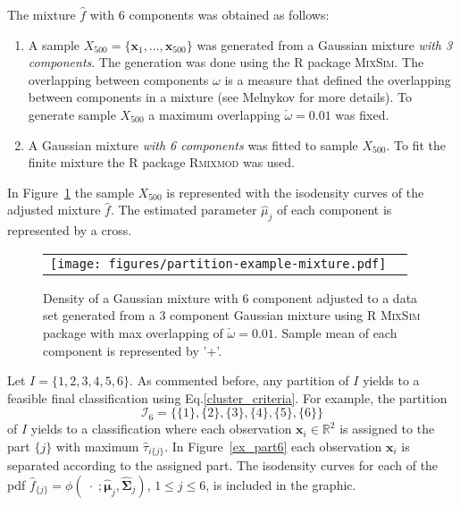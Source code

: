 \documentclass[10pt, a4paper]{article}
\DeclareMathOperator*{\argmax}{arg\,max}
\newcommand{\m}[1]{\boldsymbol{#1}}
\begin{document}
The mixture $\hat{f}$ with $6$ components was obtained as follows:
\begin{enumerate}
\item A sample  $X_{500}=\{\m x_1, \dots, \m x_{500}\}$ was generated from a Gaussian mixture \emph{with 3 components}. The generation was done using the R package \textsc{MixSim}. The overlapping between components $\omega$ is a measure that defined the overlapping between components in a mixture (see Melnykov for more details). To generate sample $X_{500}$ a maximum overlapping $\check{\omega} = 0.01$ was fixed.
\item A Gaussian mixture \emph{with 6 components} was fitted to sample $X_{500}$. To fit the finite mixture the R package \textsc{Rmixmod} was used.
\end{enumerate}
In Figure~\ref{ex_mixture} the sample $X_{500}$ is represented with the isodensity curves of the adjusted mixture $\hat{f}$. The estimated parameter $\hat{\mu}_j$ of each component is represented by a cross.

\begin{figure}[thbp]
\begin{center}
\begin{tabular}{cc}
  \texttt{[image: figures/partition-example-mixture.pdf]} \\
 \end{tabular}
 \caption{Density of a Gaussian mixture with 6 component adjusted to a data set generated from a 3 component Gaussian mixture using R \textsc{MixSim} package with max overlapping of $\check{\omega} = 0.01$. Sample mean of each component is represented by '+'.}\label{ex_mixture}
\end{center}
\end{figure}

Let $I = \{1,2,3,4,5,6\}$. As commented before, any partition of $I$ yields to a feasible final classification using Eq.\ref{cluster_criteria}. For example, the partition 
\[
\mathcal{I}_6 = \{\{1\},\{2\},\{3\},\{4\},\{5\},\{6\}\}
\]
of $I$ yields to a classification where each observation $\m x_i \in \mathbb{R}^2$ is  assigned to the part $\{j\}$ with maximum $\hat{\tau}_{i\{j\}}$. In Figure~\ref{ex_part6} each observation $\m x_i$ is separated according to the assigned part. The isodensity curves for each of the pdf $\hat{f}_{\{j\}} = \phi(\;\cdot\; ; \hat{\m\mu}_j, \hat{\m\Sigma}_j)$, $1\leq j \leq 6$, is included in the graphic. 

\end{document}

